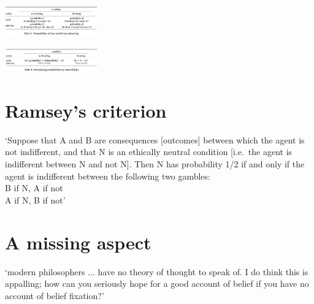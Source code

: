 \documentclass[11pt]{extarticle}
\begin{document}
\begin{multicols}{3}
\begin{center}
  \includegraphics[width=0.3\textwidth]{table2.png}
\end{center}

\begin{center}
  \includegraphics[width=0.3\textwidth]{table4.png}
\end{center}


\section{Ramsey's criterion}
`Suppose that A and B are consequences [outcomes] between which the agent is not indifferent, and that N is an ethically neutral condition [i.e.\ the agent is indifferent between N and not N]. 
Then N has probability 1/2 if and only if the agent is indifferent between the following two gambles:
	\\ \hspace*{10 mm} B if N, A if not 
	\\ \hspace*{10 mm} A if N, B if not'%
	\citep%
	{Jeffrey:1983oe}


\section{A missing aspect}
`modern philosophers ... have no theory of thought to speak of. I do think this is appalling; how can you seriously hope for a good account of belief if you have no account of belief fixation?'%
\citep%
{Fodor:1987rt}




\footnotesize 


\end{multicols}
\end{document}

